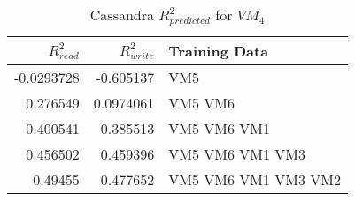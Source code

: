 \begin{table}
\centering
\caption{Cassandra $R_{predicted}^2$ for $VM_4$}
\begin{tabular}{|r|r|l|} \hline
$R_{read}^2$&$R_{write}^2$&Training Data\\ \hline
-0.0293728 & -0.605137  & VM5 \\ \hline 
0.276549 & 0.0974061  & VM5 VM6 \\ \hline 
0.400541 & 0.385513  & VM5 VM6 VM1 \\ \hline 
0.456502 &  0.459396 & VM5 VM6 VM1 VM3 \\ \hline 
0.49455 &  0.477652 & VM5 VM6 VM1 VM3 VM2 \\ \hline 
\hline\end{tabular}
\label{table:cassandra4}
\end{table}
